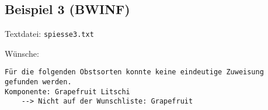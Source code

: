 \subsection{Beispiel 3 (BWINF)}\label{example:3}
Textdatei: \texttt{spiesse3.txt}
\vspace{0.25cm}

\noindent
Wünsche: 
\vspace{0.25cm}

\noindent
{}
\begin{verbatim}
Für die folgenden Obstsorten konnte keine eindeutige Zuweisung gefunden werden.
Komponente: Grapefruit Litschi 
	--> Nicht auf der Wunschliste: Grapefruit 
\end{verbatim}
